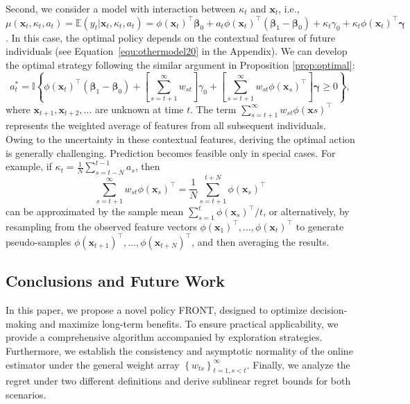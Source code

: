 \documentclass[12pt]{article}
\begin{document}
Second, we consider a model with interaction between \(\kappa_t\) and \(\bm{x}_t\), i.e., $\mu(\bm{x}_t, \kappa_t, a_t) = \mathbb{E}(y_t \vert \bm{x}_t, \kappa_t, a_t) = \phi(\bm{x}_t)^{\top}\bm{\beta}_0+a_t\phi(\bm{x}_t)^{\top}(\bm{\beta}_1-\bm{\beta}_0)+\kappa_t\gamma_0+\kappa_t \phi(\bm{x}_t)^{\top} \bm{\gamma}$. In this case, the optimal policy depends on the contextual features of future individuals (see Equation~\eqref{equ:othermodel20} in the Appendix). We can develop the optimal strategy following the similar argument in Proposition \ref{prop:optimal}:
\begin{equation*}
    a_t^\ast = 
        \mathbb{I}\left\{\phi(\bm{x}_t)^{\top} (\bm{\beta}_1-\bm{\beta}_0) + \left[\sum_{s=t+1}^\infty w_{st}\right] \gamma_0 + \left[\sum_{s=t+1}^\infty w_{st}\phi(\bm{x}_s)^\top\right] \bm{\gamma} \ge 0 \right\},
\end{equation*}
where $\bm{x}_{t+1}, \bm{x}_{t+2}, \dots$ are unknown at time $t$. The term $\sum_{s=t+1}^\infty w_{st}\phi(\bm{x}s)^\top$ represents the weighted average of features from all subsequent individuals. Owing to the uncertainty in these contextual features, deriving the optimal action is generally challenging. Prediction becomes feasible only in special cases. For example, if $\kappa_t = \tfrac{1}{N}\sum_{s=t-N}^{t-1}a_s$, then
\begin{equation*}
    \sum_{s=t+1}^\infty w_{st}\phi(\bm{x}_s)^\top=\frac{1}{N}\sum_{s=t+1}^{t+N}\phi(\bm{x}_s)^\top
\end{equation*}
can be approximated by the sample mean $\sum_{s=1}^t \phi(\bm{x}_s)^\top /t$, or alternatively, by resampling from the observed feature vectors $\phi(\bm{x}_1)^\top, \dots, \phi(\bm{x}_t)^\top$ to generate pseudo-samples $\phi(\bm{x}_{t+1})^\top, \dots, \phi(\bm{x}_{t+N})^\top$, and then averaging the results.

\subsection{Conclusions and Future Work}
\label{sec:conclusion}
In this paper, we propose a novel policy FRONT, designed to optimize decision-making and maximize long-term benefits. To ensure practical applicability, we provide a comprehensive algorithm accompanied by exploration strategies. Furthermore, we establish the consistency and asymptotic normality of the online estimator under the general weight array $\left\{w_{ts} \right\}_{t=1,s<t}^\infty$. Finally, we analyze the regret under two different definitions and derive sublinear regret bounds for both scenarios.
\end{document}
